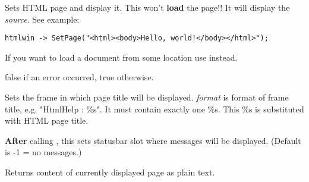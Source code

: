 \label{wxhtmlwindowsetpage}


Sets HTML page and display it. This won't {\bf load} the page!!
It will display the {\it source}. See example:

\begin{verbatim}
htmlwin -> SetPage("<html><body>Hello, world!</body></html>");
\end{verbatim}

If you want to load a document from some location use 
 instead.




false if an error occurred, true otherwise.

\label{wxhtmlwindowsetrelatedframe}


Sets the frame in which page title will be displayed. {\it format} is format of
frame title, e.g. "HtmlHelp : \%s". It must contain exactly one \%s. This
\%s is substituted with HTML page title.

\label{wxhtmlwindowsetrelatedstatusbar}


{\bf After} calling ,
this sets statusbar slot where messages will be displayed.
(Default is -1 = no messages.)



\label{wxhtmlwindowtotext}


Returns content of currently displayed page as plain text.

\label{wxhtmlwindowwritecustomization}


